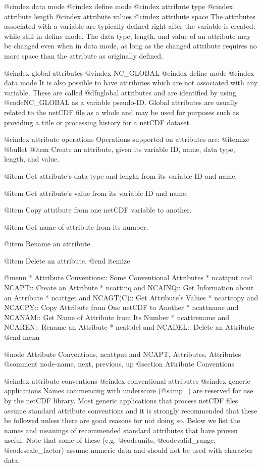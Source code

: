 @cindex data mode
@cindex define mode
@cindex attribute type
@cindex attribute length
@cindex attribute values
@cindex attribute space
The attributes associated with a variable are typically defined right
after the variable is created, while still in define mode.  The data
type, length, and value of an attribute may be changed even when in data
mode, as long as the changed attribute requires no more space than the
attribute as originally defined.

@cindex global attributes
@vindex NC_GLOBAL
@cindex define mode
@cindex data mode
It is also possible to have attributes which are not associated with any
variable.
These are called @dfn{global attributes} and are identified
by using @code{NC_GLOBAL} as a variable pseudo-ID.
Global attributes are usually related to the netCDF file as a whole and
may be used for purposes such as
providing a title or processing history for a netCDF dataset.

@cindex attribute operations
Operations supported on attributes are:
@itemize @bullet
@item
Create an attribute, given its variable ID, name, data type, length, and
value.

@item
Get attribute's data type and length from its variable ID and name.

@item
Get attribute's value from its variable ID and name.

@item
Copy attribute from one netCDF variable to another.

@item
Get name of attribute from its number.

@item
Rename an attribute.

@item
Delete an attribute.
@end itemize

@menu
* Attribute Conventions::       Some Conventional Attributes
* ncattput and NCAPT::          Create an Attribute
* ncattinq and NCAINQ::         Get Information about an Attribute
* ncattget and NCAGT(C)::       Get Attribute's Values
* ncattcopy and NCACPY::        Copy Attribute from One netCDF to Another
* ncattname and NCANAM::        Get Name of Attribute from Its Number
* ncattrename and NCAREN::      Rename an Attribute
* ncattdel and NCADEL::         Delete an Attribute
@end menu


@node    Attribute Conventions, ncattput and NCAPT, Attributes, Attributes
@comment  node-name,  next,  previous,  up
@section Attribute Conventions


@cindex attribute conventions
@cindex conventional attributes
@cindex generic applications
Names commencing with underscore (@samp{_}) are reserved for use by the
netCDF library.  Most generic applications that process netCDF files
assume standard attribute conventions and it is strongly recommended
that these be followed unless there are good reasons for not doing so.
Below we list the names and meanings of recommended standard attributes
that have proven useful.
Note that some of these (e.g. @code{units}, @code{valid_range}, 
@code{scale_factor}) assume numeric data and should not be used with
character data.

